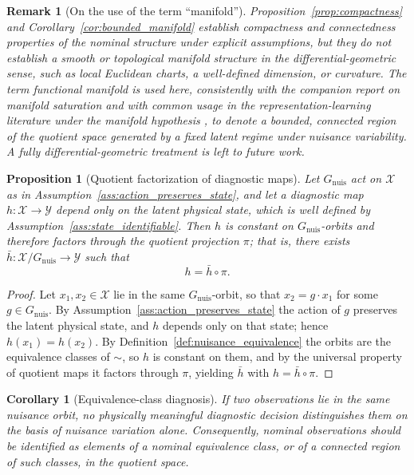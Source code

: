 \documentclass[a4paper]{cas-sc}
\newtheorem{proposition}{Proposition}
\newtheorem{corollary}{Corollary}
\newtheorem{remark}{Remark}
\newcommand{\X}{\ensuremath{\mathcal{X}}}
\newcommand{\Gnuis}{\ensuremath{G_{\mathrm{nuis}}}}
\newcommand{\quotient}{\ensuremath{\mathcal{X}/G_{\mathrm{nuis}}}}
\begin{document}
\begin{remark}[On the use of the term ``manifold'']
\label{rem:manifold_terminology}
Proposition~\ref{prop:compactness} and
Corollary~\ref{cor:bounded_manifold} establish compactness and
connectedness properties of the nominal structure under explicit
assumptions, but they do \emph{not} establish a smooth or topological
manifold structure in the differential-geometric sense, such as local
Euclidean charts, a well-defined dimension, or curvature. The term
\emph{functional manifold} is used here, consistently with the companion
report on manifold saturation \citep{disanti2026inverse} and with common
usage in the representation-learning literature under the manifold
hypothesis \citep{bronstein2021}, to denote a bounded, connected region of
the quotient space generated by a fixed latent regime under nuisance
variability. A fully differential-geometric treatment is left to future
work.
\end{remark}

\begin{proposition}[Quotient factorization of diagnostic maps]
\label{prop:quotient_diagnosis}
Let \(\Gnuis\) act on \(\X\) as in
Assumption~\ref{ass:action_preserves_state}, and let a diagnostic map
\(h:\X\to\mathcal{Y}\) depend only on the latent physical state, which is
well defined by Assumption~\ref{ass:state_identifiable}. Then \(h\) is
constant on \(\Gnuis\)-orbits and therefore factors through the quotient
projection \(\pi\); that is, there exists
\(\bar h:\quotient\to\mathcal{Y}\) such that
\begin{equation}
h = \bar h \circ \pi .
\label{eq:factorization}
\end{equation}
\end{proposition}

\begin{proof}
Let \(x_1,x_2\in\X\) lie in the same \(\Gnuis\)-orbit, so that
\(x_2=g\cdot x_1\) for some \(g\in\Gnuis\). By
Assumption~\ref{ass:action_preserves_state} the action of \(g\) preserves the
latent physical state, and \(h\) depends only on that state; hence
\(h(x_1)=h(x_2)\). By Definition~\ref{def:nuisance_equivalence} the orbits are
the equivalence classes of \(\sim\), so \(h\) is constant on them, and by the
universal property of quotient maps it factors through \(\pi\), yielding
\(\bar h\) with \(h=\bar h\circ\pi\).
\end{proof}

\begin{corollary}[Equivalence-class diagnosis]
\label{cor:equivalence_class_diagnosis}
If two observations lie in the same nuisance orbit, no physically meaningful
diagnostic decision distinguishes them on the basis of nuisance variation
alone. Consequently, nominal observations should be identified as elements
of a nominal equivalence class, or of a connected region of such classes,
in the quotient space.
\end{corollary}
\end{document}
